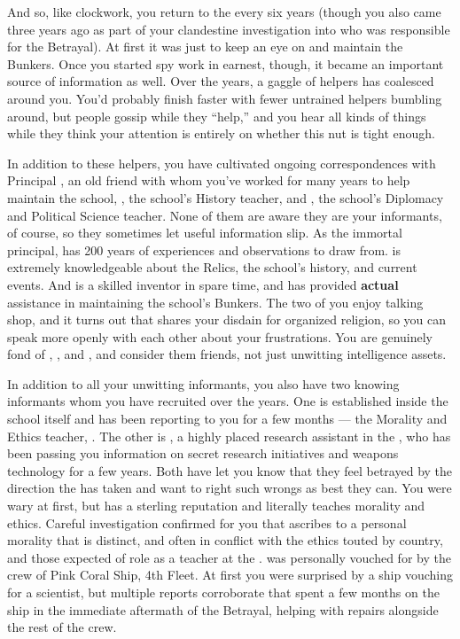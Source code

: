 \documentclass[char]{GL2020}
\begin{document}
And so, like clockwork, you return to the \pSchool{} every six years (though you also came three years ago as part of your clandestine investigation into who was responsible for the Betrayal). At first it was just to keep an eye on and maintain the Bunkers. Once you started spy work in earnest, though, it became an important source of information as well. Over the years, a gaggle of helpers has coalesced around you. You'd probably finish faster with fewer untrained helpers bumbling around, but people gossip while they ``help,'' and you hear all kinds of things while they think your attention is entirely on whether this nut is tight enough. 

In addition to these helpers, you have cultivated ongoing correspondences with Principal \cPrincipal{\intro}, an old friend with whom you've worked for many years to help maintain the school, \cHistory{\intro}, the school's History teacher, and \cChupInventor{\intro}, the school’s Diplomacy and Political Science teacher. None of them are aware they are your informants, of course, so they sometimes let useful information slip. As the immortal principal, \cPrincipal{} has 200 years of experiences and observations to draw from. \cHistory{} is extremely knowledgeable about the Relics, the school's history, and current events. And \cChupInventor{} is a skilled inventor in \cChupInventor{\their} spare time, and has provided \textbf{actual} assistance in maintaining the school’s Bunkers. The two of you enjoy talking shop, and it turns out that \cChupInventor{} shares your disdain for organized religion, so you can speak more openly with each other about your frustrations. You are genuinely fond of \cPrincipal{}, \cHistory{}, and \cChupInventor{}, and consider them friends, not just unwitting intelligence assets. 

In addition to all your unwitting informants, you also have two knowing informants whom you have recruited over the years. One is established inside the school itself and has been reporting to you for a few months — the Morality and Ethics teacher, \cEthics{\intro}. The other is \cAssistantScientist{\intro}, a highly placed research assistant in the \pTech{}, who has been passing you information on secret research initiatives and weapons technology for a few years. Both have let you know that they feel betrayed by the direction the \pTech{} has taken and want to right such wrongs as best they can. You were wary at first, but \cEthics{} has a sterling reputation and literally teaches morality and ethics. Careful investigation confirmed for you that \cEthics{} ascribes to a personal morality that is distinct, and often in conflict with the ethics touted by \cEthics{\their} country, and those expected of \cEthics{\their} role as a teacher at the \pSc{}. \cAssistantScientist{} was personally vouched for by the crew of Pink Coral Ship, 4th Fleet. At first you were surprised by a \pShippie{} ship vouching for a \pTech{} scientist, but multiple reports corroborate that \cAssistantScientist{\they} spent a few months on the ship in the immediate aftermath of the Betrayal, helping with repairs alongside the rest of the crew.
\end{document}
